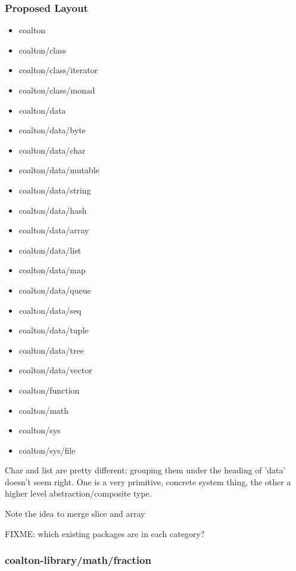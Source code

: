 \documentclass[12pt]{article}
\begin{document}
\subsubsection{Proposed Layout}

\begin{itemize}
\item coalton
\item coalton/class
\item coalton/class/iterator
\item coalton/class/monad
\item coalton/data
\item coalton/data/byte
\item coalton/data/char
\item coalton/data/mutable
\item coalton/data/string

\item coalton/data/hash
\item coalton/data/array
\item coalton/data/list
\item coalton/data/map
\item coalton/data/queue
\item coalton/data/seq
\item coalton/data/tuple
\item coalton/data/tree
\item coalton/data/vector

\item coalton/function
\item coalton/math
\item coalton/sys
\item coalton/sys/file
\end {itemize}


Char and list are pretty different: grouping them under the heading of 'data' doesn't seem right. One is a very primitive, concrete system thing, the other a higher level abstraction/composite type.



Note the idea to merge slice and array

FIXME: which existing packages are in each category?

\subsubsection{coalton-library/math/fraction}
\end{document}

